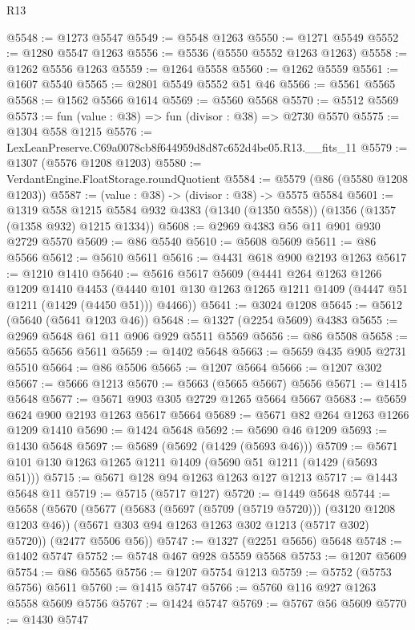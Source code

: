 \begin{lexlean}{R13}
\begin{coremodule}
@5548 := @1273 @5547
@5549 := @5548 @1263
@5550 := @1271 @5549
@5552 := @1280 @5547 @1263
@5556 := @5536 (@5550 @5552 @1263 @1263)
@5558 := @1262 @5556 @1263
@5559 := @1264 @5558
@5560 := @1262 @5559
@5561 := @1607 @5540
@5565 := @2801 @5549 @5552 @51 @46
@5566 := @5561 @5565
@5568 := @1562 @5566 @1614
@5569 := @5560 @5568
@5570 := @5512 @5569
@5573 := fun (value : @38) => fun (divisor : @38) => @2730 @5570
@5575 := @1304 @558 @1215
@5576 := LexLeanPreserve.C69a0078cb8f644959d8d87c652d4be05.R13.__fits_11
@5579 := @1307 (@5576 @1208 @1203)
@5580 := VerdantEngine.FloatStorage.roundQuotient
@5584 := @5579 (@86 (@5580 @1208 @1203))
@5587 := (value : @38) -> (divisor : @38) -> @5575 @5584
@5601 := @1319
    @558
    @1215
    @5584
    @932
    @4383
    (@1340 (@1350 @558))
    (@1356 (@1357 (@1358 @932) @1215 @1334))
@5608 := @2969 @4383 @56 @11 @901 @930 @2729 @5570
@5609 := @86 @5540
@5610 := @5608 @5609
@5611 := @86 @5566
@5612 := @5610 @5611
@5616 := @4431 @618 @900 @2193 @1263
@5617 := @1210 @1410
@5640 := @5616
    @5617
    @5609
    (@4441
      @264
      @1263
      @1266
      @1209
      @1410
      @4453
      (@4440 @101 @130 @1263 @1265 @1211 @1409 (@4447 @51 @1211 (@1429 (@4450 @51))) @4466))
@5641 := @3024 @1208
@5645 := @5612 (@5640 (@5641 @1203 @46))
@5648 := @1327 (@2254 @5609) @4383
@5655 := @2969 @5648 @61 @11 @906 @929 @5511 @5569
@5656 := @86 @5508
@5658 := @5655 @5656 @5611
@5659 := @1402 @5648
@5663 := @5659 @435 @905 @2731 @5510
@5664 := @86 @5506
@5665 := @1207 @5664
@5666 := @1207 @302
@5667 := @5666 @1213
@5670 := @5663 (@5665 @5667) @5656
@5671 := @1415 @5648
@5677 := @5671 @903 @305 @2729 @1265 @5664 @5667
@5683 := @5659 @624 @900 @2193 @1263 @5617 @5664
@5689 := @5671 @82 @264 @1263 @1266 @1209 @1410
@5690 := @1424 @5648
@5692 := @5690 @46 @1209
@5693 := @1430 @5648
@5697 := @5689 (@5692 (@1429 (@5693 @46)))
@5709 := @5671 @101 @130 @1263 @1265 @1211 @1409 (@5690 @51 @1211 (@1429 (@5693 @51)))
@5715 := @5671 @128 @94 @1263 @1263 @127 @1213
@5717 := @1443 @5648 @11
@5719 := @5715 (@5717 @127)
@5720 := @1449 @5648
@5744 := @5658
    (@5670
      (@5677
        (@5683 (@5697 (@5709 (@5719 @5720))) (@3120 @1208 @1203 @46))
        (@5671 @303 @94 @1263 @1263 @302 @1213 (@5717 @302) @5720))
      (@2477 @5506 @56))
@5747 := @1327 (@2251 @5656) @5648
@5748 := @1402 @5747
@5752 := @5748 @467 @928 @5559 @5568
@5753 := @1207 @5609
@5754 := @86 @5565
@5756 := @1207 @5754 @1213
@5759 := @5752 (@5753 @5756) @5611
@5760 := @1415 @5747
@5766 := @5760 @116 @927 @1263 @5558 @5609 @5756
@5767 := @1424 @5747
@5769 := @5767 @56 @5609
@5770 := @1430 @5747

\end{coremodule}
\end{lexlean}
